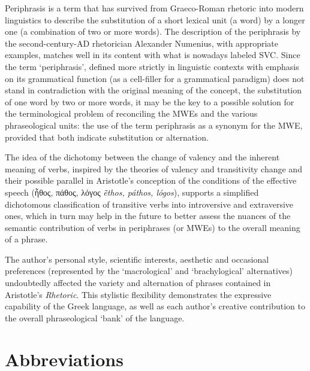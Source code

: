 \documentclass[output=paper,colorlinks,citecolor=brown]{langscibook}
\begin{document}
Periphrasis is a term that has survived from Graeco-Roman rhetoric into modern linguistics to describe the substitution of a short lexical unit (a word) by a longer one (a combination of two or more words). The description of the periphrasis by the second-century-AD rhetorician Alexander Numenius, with appropriate examples, matches well in its content with what is nowadays labeled SVC. Since the term ‘periphrasis’, defined more strictly in linguistic contexts with emphasis on its grammatical function (as a cell-filler for a grammatical paradigm) does not stand in contradiction with the original meaning of the concept, the substitution of one word by two or more words, it may be the key to a possible solution for the terminological problem of reconciling the MWEs and the various phraseological units: the use of the term periphrasis as a synonym for the MWE, provided that both indicate substitution or alternation.  

The idea of the dichotomy between the change of valency and the inherent meaning of verbs, inspired by the theories of valency and transitivity change and their possible parallel in Aristotle’s conception of the conditions of the effective speech (ἦθος, πάθος, λόγος \textit{ē̃thos, páthos, lógos}), supports a simplified dichotomous classification of transitive verbs into introversive and extraversive ones, which in turn may help in the future to better assess the nuances of the semantic contribution of verbs in periphrases (or MWEs) to the overall meaning of a phrase.

The author’s personal style, scientific interests, aesthetic and occasional preferences (represented by the ‘macrological’ and ‘brachylogical’ alternatives) undoubtedly affected the variety and alternation of phrases contained in Aristotle’s \textit{Rhetoric}. This stylistic flexibility demonstrates the expressive capability of the Greek language, as well as each author’s creative contribution to the overall phraseological ‘bank’ of the language.




\section*{Abbreviations}
\end{document}
